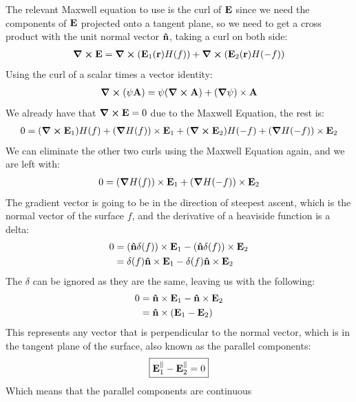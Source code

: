 \documentclass[12pt]{article}
\begin{document}
The relevant Maxwell equation to use is the curl of $\vb{E}$ since we need the components of $\vb{E}$ projected onto a tangent plane, so we need to get a cross product with the unit normal vector $\vu{n}$, taking a curl on both side:
\begin{align*}
  \curl{\vb{E}}=\curl{(\vb{E}_1(\vb{r})H(f))}+\curl{(\vb{E}_2(\vb{r})H(-f))}
\end{align*}
Using the curl of a scalar times a vector identity:
\begin{align*}
  \curl{(\psi\vb{A})}=\psi\qty(\curl{\vb{A}})+(\grad{\psi})\times\vb{A}
\end{align*}
We already have that $\curl{\vb{E}}=0$ due to the Maxwell Equation, the rest is:
\begin{align*}
  0=(\curl{\vb{E}_1})H(f)+(\grad{H(f)})\times\vb{E}_1
  +(\curl{\vb{E}_2})H(-f)+(\grad{H(-f)})\times\vb{E}_2
\end{align*}
We can eliminate the other two curls using the Maxwell Equation again, and we are left with:
\begin{align*}
  0=(\grad{H(f)})\times\vb{E}_1
  +(\grad{H(-f)})\times\vb{E}_2
\end{align*}
The gradient vector is going to be in the direction of steepest ascent, which is the normal vector of the surface $f$, and the derivative of a heaviside function is a delta:
\begin{align*}
  0&=(\vu{n}\delta(f))\times\vb{E}_1-(\vu{n}\delta(f))\times\vb{E}_2\\
  &=\delta(f)\vu{n}\times\vb{E}_1-\delta(f)\vu{n}\times\vb{E}_2
\end{align*}
The $\delta$ can be ignored as they are the same, leaving us with the following:
\begin{align*}
  0&=\vu{n}\times\vb{E}_1-\vu{n}\times\vb{E}_2\\
  &=\vu{n}\times\qty(\vb{E}_1-\vb{E}_2)
\end{align*}
This represents any vector that is perpendicular to the normal vector, which is in the tangent plane of the surface, also known as the parallel components:
\begin{align}
  \boxed{\vb{E}_1^{\parallel}-\vb{E}_2^{\parallel}=0}
\end{align}
Which means that the parallel components are continuous
\end{document}
